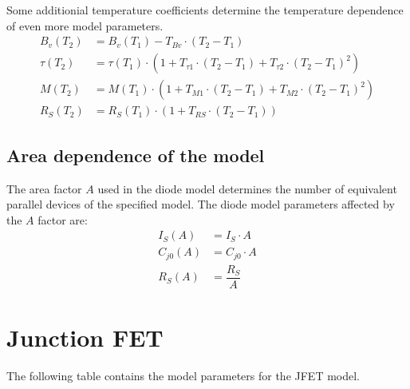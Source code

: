 Some additionial temperature coefficients determine the temperature
dependence of even more model parameters.
\begin{align}
B_{v}\left(T_2\right) &= B_{v}\left(T_1\right) - T_{Bv}\cdot\left(T_2 - T_1\right)\\
\tau\left(T_2\right) &= \tau\left(T_1\right)\cdot\left(1 + T_{\tau 1}\cdot\left(T_2 - T_1\right) + T_{\tau 2}\cdot\left(T_2 - T_1\right)^2\right)\\
M\left(T_2\right) &= M\left(T_1\right)\cdot\left(1 + T_{M1}\cdot\left(T_2 - T_1\right) + T_{M2}\cdot\left(T_2 - T_1\right)^2\right)\\
R_S\left(T_2\right) &= R_S\left(T_1\right)\cdot\left(1 + T_{RS}\cdot\left(T_2 - T_1\right)\right)
\end{align}

\subsection{Area dependence of the model}

The area factor $A$ used in the diode model determines the number of
equivalent parallel devices of the specified model.  The diode model
parameters affected by the $A$ factor are:
\begin{align}
I_S\left(A\right) &= I_S\cdot A\\
C_{j0}\left(A\right) &= C_{j0}\cdot A\\
R_S\left(A\right) &= \dfrac{R_S}{A}
\end{align}

\section{Junction FET}

The following table contains the model parameters for the JFET model.

\addvspace{12pt}

